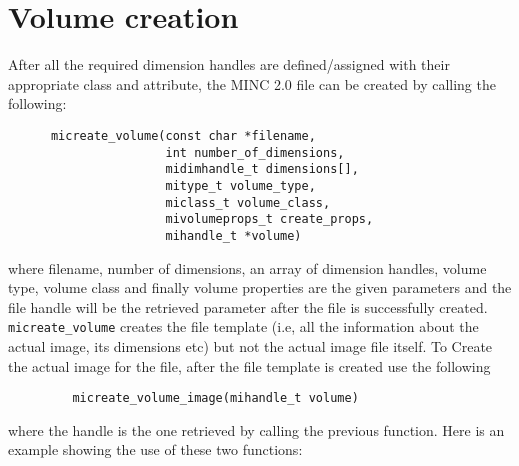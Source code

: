 \documentclass{article}
\begin{document}
\section{Volume creation}
After all the required dimension handles are defined/assigned with their appropriate 
class and attribute, the MINC 2.0 file can be created by calling the following:
\begin{verbatim}
      micreate_volume(const char *filename, 
                      int number_of_dimensions,
                      midimhandle_t dimensions[], 
                      mitype_t volume_type,
                      miclass_t volume_class, 
                      mivolumeprops_t create_props,
                      mihandle_t *volume)
\end{verbatim}
where filename, number of dimensions, an array of dimension handles, volume type, 
volume class and finally volume properties are the given parameters and the file handle
will be the  retrieved parameter after the file is successfully created.
{\tt micreate\_volume} creates the file template (i.e, all the information about the actual
image, its dimensions etc) but not the actual image file itself.
To Create the actual image for the file, after the file template is created use the following
\begin{verbatim}
         micreate_volume_image(mihandle_t volume)
\end{verbatim}
where the handle is the one retrieved by calling the previous function.    
Here is an example showing the use of these two functions:
\end{document}
